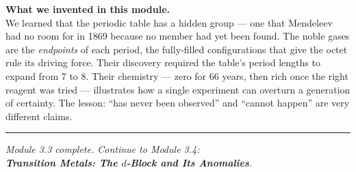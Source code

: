 \documentclass[12pt, a4paper]{book}
\begin{document}
\vspace{1.5em}
\begin{center}
\begin{tcolorbox}[enhanced, colback=DiscoveryColor!8, colframe=DiscoveryColor,
  width=0.88\textwidth, arc=3pt]
\centering\sffamily\small
\textbf{What we invented in this module.}\\[4pt]
We learned that the periodic table has a hidden group ---
one that Mendeleev had no room for in 1869 because no member
had yet been found.
The noble gases are the \emph{endpoints} of each period,
the fully-filled configurations that give the octet rule
its driving force.
Their discovery required the table's period lengths to expand
from 7 to 8.
Their chemistry --- zero for 66 years, then rich once the right
reagent was tried --- illustrates how a single experiment
can overturn a generation of certainty.
The lesson: ``has never been observed'' and ``cannot happen''
are very different claims.
\end{tcolorbox}
\end{center}

\vspace{2em}
\noindent\textcolor{JourneyColor!40}{\rule{\textwidth}{0.6pt}}
\begin{center}
\textit{\sffamily\small
Module 3.3 complete. Continue to Module 3.4:\\
\textbf{Transition Metals: The $d$-Block and Its Anomalies}.}
\end{center}
\end{document}
